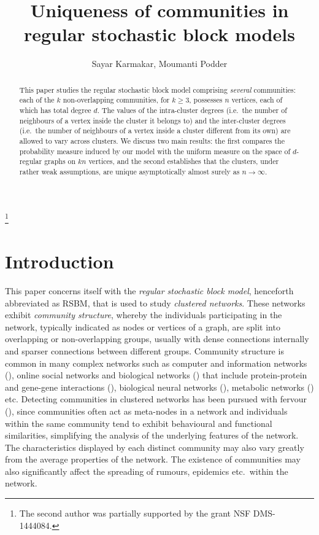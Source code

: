 \documentclass[11pt,reqno]{amsart}
\title[Uniqueness of RSBM communities]{Uniqueness of communities in regular stochastic block models}
\date{}
\author{Sayar Karmakar, Moumanti Podder}
\theoremstyle{definition}
\theoremstyle{remark}
\theoremstyle{conjecture}
\begin{document}



\begin{abstract}
This paper studies the regular stochastic block model comprising \emph{several} communities: each of the $k$ non-overlapping communities, for $k \geqslant 3$, possesses $n$ vertices, each of which has total degree $d$. The values of the intra-cluster degrees (i.e.\ the number of neighbours of a vertex inside the cluster it belongs to) and the inter-cluster degrees (i.e.\ the number of neighbours of a vertex inside a cluster different from its own) are allowed to vary across clusters. We discuss two main results: the first compares the probability measure induced by our model with the uniform measure on the space of $d$-regular graphs on $kn$ vertices, and the second establishes that the clusters, under rather weak assumptions, are unique asymptotically almost surely as $n \rightarrow \infty$.  
\end{abstract}



\thanks{The second author was partially supported by the grant NSF DMS-1444084.}

\maketitle

\section{Introduction}\label{intro}
\sloppy This paper concerns itself with the \emph{regular stochastic block model}, henceforth abbreviated as RSBM, that is used to study \emph{clustered networks}. These networks exhibit \emph{community structure}, whereby the individuals participating in the network, typically indicated as nodes or vertices of a graph, are split into overlapping or non-overlapping groups, usually with dense connections internally and sparser connections between different groups. Community structure is common in many complex networks such as computer and information networks (\cite{statistical_SBM}), online social networks and biological networks (\cite{girvan_newman, choudhury_paul, fani_bagheri, moosavi}) that include protein-protein and gene-gene interactions (\cite{genetic}), biological neural networks (\cite{brain}), metabolic networks (\cite{metabolic}) etc. Detecting communities in clustered networks has been pursued with fervour (\cite{newman_1, newman_fast, newman_2, fast_unfolding, nadakuditi_newman, karrer_newman}), since communities often act as meta-nodes in a network and individuals within the same community tend to exhibit behavioural and functional similarities, simplifying the analysis of the underlying features of the network. The characteristics displayed by each distinct community may also vary greatly from the average properties of the network. The existence of communities may also significantly affect the spreading of rumours, epidemics etc.\ within the network.
\end{document}
